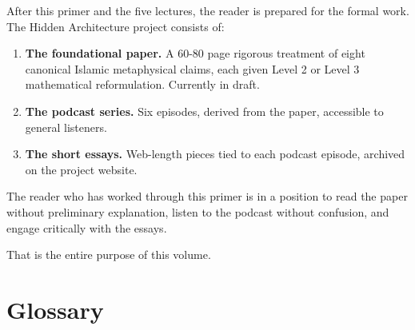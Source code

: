 \documentclass[11pt,a4paper]{book}
\theoremstyle{cleanrm}
\begin{document}
After this primer and the five lectures, the reader is prepared for
the formal work. The Hidden Architecture project consists of:

\begin{enumerate}[leftmargin=2em]
    \item \textbf{The foundational paper.} A 60-80 page rigorous
    treatment of eight canonical Islamic metaphysical claims, each
    given Level 2 or Level 3 mathematical reformulation. Currently
    in draft.
    \item \textbf{The podcast series.} Six episodes, derived from
    the paper, accessible to general listeners.
    \item \textbf{The short essays.} Web-length pieces tied to each
    podcast episode, archived on the project website.
\end{enumerate}

The reader who has worked through this primer is in a position to
read the paper without preliminary explanation, listen to the podcast
without confusion, and engage critically with the essays.

That is the entire purpose of this volume.

\chapter*{Glossary}
\end{document}
